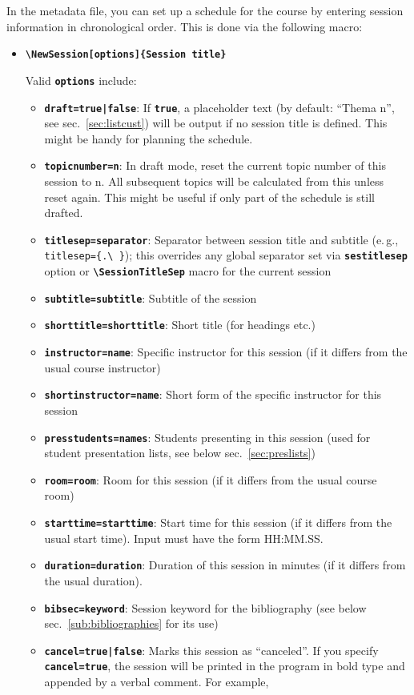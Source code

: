 \documentclass[english]{article}
\newcommand*\jmacro[1]{\textbf{\texttt{#1}}}
\newcommand*\jcsmacro[1]{\jmacro{\textbackslash{#1}}}
\newcommand*\joption[1]{\textbf{\texttt{#1}}}
\newcommand*\jparam[1]{\angus #1\angud}
\begin{document}
In the metadata file, you can set up a schedule for the course by entering
session information in chronological order. This is done via the following
macro:
\begin{itemize}
\item \jcsmacro{NewSession[\jparam{options}]\{Session title\}}


Valid \joption{\jparam{options}} include:
\begin{itemize}
\item \joption{draft=\jparam{true|false}}: If \joption{true}, a placeholder text (by default: ``Thema \jparam{n}'',
    see sec.~\ref{sec:listcust}) will be output if no session title is defined.
    This might be handy for planning the schedule.
\item \joption{topicnumber=\jparam{n}}: In draft mode, reset the current topic number of this session to \jparam{n}.
    All subsequent topics will be calculated from this unless reset again. This might be useful if only part of
    the schedule is still drafted.
\item \joption{titlesep=\jparam{separator}}: Separator between session title and
    subtitle (e.\,g., \verb|titlesep={.\ }|); this overrides any global separator set via \joption{sestitlesep} option
    or \jcsmacro{SessionTitleSep} macro for the current session
\item \joption{subtitle=\jparam{subtitle}}: Subtitle of the session
\item \joption{shorttitle=\jparam{shorttitle}}: Short title (for
    headings etc.)
\item \joption{instructor=\jparam{name}}: Specific instructor for this session
    (if it differs from the usual course instructor)
\item \joption{shortinstructor=\jparam{name}}: Short form of the specific instructor for this session
\item \joption{presstudents=\jparam{names}}: Students presenting in this session
    (used for student presentation lists, see below sec.~\ref{sec:preslists})
\item \joption{room=\jparam{room}}: Room for this session (if it differs
    from the usual course room)
\item \joption{starttime=\jparam{starttime}}: Start time for this session (if it differs
     from the usual start time). Input must have the form HH:MM.SS.
\item \joption{duration=\jparam{duration}}: Duration of this session in minutes (if it differs
     from the usual duration).
\item \joption{bibsec=\jparam{keyword}}: Session keyword for the bibliography
    (see below sec.~\ref{sub:bibliographies} for its use)
\item \joption{cancel=\jparam{true|false}}: Marks this session as ``canceled''.
    If you specify \joption{cancel=true}, the session will be printed
    in the program in bold type and appended by a verbal comment.
    For example,


\end{itemize}
\end{itemize}
\end{document}
